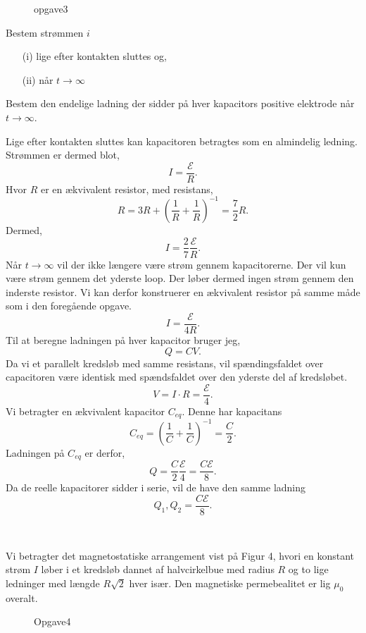 \begin{figure}[ht]
    \centering
    \caption{opgave3}
    \label{fig:opgave3}
\end{figure}
\begin{subexercise}[a]
Bestem strømmen $i$
 \begin{itemize}
	 \item[(i)] lige efter kontakten sluttes og,
	 \item [(ii)] når $t\to \infty$
\end{itemize}
Bestem den endelige ladning der sidder på hver kapacitors positive elektrode når $t\to \infty$.
\end{subexercise}
\begin{solution}
Lige efter kontakten sluttes kan kapacitoren betragtes som en almindelig ledning. Strømmen er dermed blot,
\[
I = \frac{\mathcal{E} }{R} 
.\] 
Hvor $R$ er en ækvivalent resistor, med resistans,
 \[
R = 3R + \left( \frac{1}{R}+\frac{1}{R} \right) ^{-1} = \frac{7}{2}R
.\]
Dermed,
\[
I = \frac{2}{7}\frac{\mathcal{E} }{R}
.\]
Når $t\to \infty$ vil der ikke længere være strøm gennem kapacitorerne. Der vil kun være strøm gennem det yderste loop. Der løber dermed ingen strøm gennem den inderste resistor. Vi kan derfor konstruerer en ækvivalent resistor på samme måde som i den foregående opgave.
\[
I = \frac{\mathcal{E} }{4R}
.\]
Til at beregne ladningen på hver kapacitor bruger jeg,
\[
Q = CV
.\] 
Da vi et parallelt kredsløb med samme resistans, vil spændingsfaldet over capacitoren være identisk med spændsfaldet over den yderste del af kredsløbet.
\[
V = I \cdot R = \frac{\mathcal{E} }{4}
.\] 
Vi betragter en ækvivalent kapacitor $C_{eq}$. Denne har kapacitans
\[
C_{eq} = \left( \frac{1}{C}+\frac{1}{C} \right) ^{-1} = \frac{C}{2}
.\]
Ladningen på $C_{eq}$ er derfor,
\[
Q = \frac{C}{2}\frac{\mathcal{E} }{4} = \frac{C\mathcal{E} }{8}
.\] 
Da de reelle kapacitorer sidder i serie, vil de have den samme ladning
\[
Q_1, Q_2 = \frac{C\mathcal{E} }{8}
.\]
\end{solution}
\\
\begin{exercise}[Opgave 4]
Vi betragter det magnetostatiske arrangement vist på Figur 4, hvori en konstant strøm $I$ løber i et kredsløb dannet af halvcirkelbue med radius $R$ og to lige ledninger med længde $R\sqrt{2}$ hver især. Den magnetiske permebealitet er lig $\mu_0$ overalt.
\end{exercise}
\begin{figure}[ht]
    \centering
    \caption{Opgave4}
    \label{fig:opgave4}
\end{figure}
